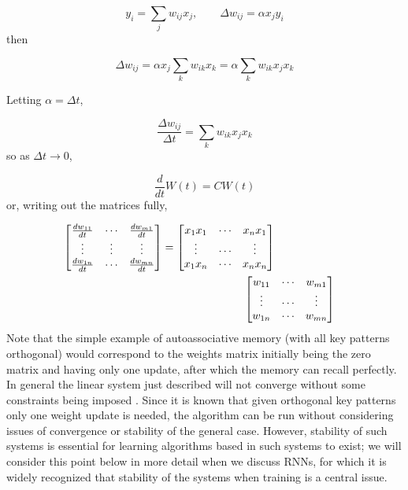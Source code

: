 \begin{equation*}
  y_i = \sum_{j} w_{ij} x_j, \qquad \Delta w_{ij} = \alpha x_j y_i
\end{equation*}
%
then

\begin{equation*}
\Delta w_{ij} = \alpha x_j \sum_k w_{ik} x_k = \alpha \sum_k w_{ik}x_j x_k
\end{equation*}

Letting $\alpha = \Delta t$,

\begin{equation*}
  \frac{\Delta w_{ij}}{\Delta t} = \sum_k w_{ik}x_j x_k
\end{equation*}
%
so as $\Delta t \rightarrow 0$,

\begin{equation*}
\frac{d}{dt}W(t) = C W(t)
\end{equation*}
%
or, writing out the matrices fully,

\begin{equation*}
  \begin{split}
  \begin{bmatrix}
    \frac{dw_{11}}{dt} & \cdots & \frac{dw_{m1}}{dt} \\
    \vdots & \vdots & \vdots \\
    \frac{dw_{1n}}{dt} & \cdots & \frac{dw_{mn}}{dt} \\
  \end{bmatrix} = \begin{bmatrix}
    x_1 x_1 & \cdots & x_n x_1 \\
    \vdots & \cdots & \vdots \\
    x_1 x_n & \cdots & x_n x_n
  \end{bmatrix} \\
  & \hspace{-1.0cm}\begin{bmatrix}
    w_{11} & \cdots & w_{m1} \\
    \vdots & \cdots & \vdots \\
    w_{1n} & \cdots & w_{mn}
    \end{bmatrix}
  \end{split}
\end{equation*}
%
Note that the simple example of autoassociative memory (with all key patterns orthogonal) would correspond to the weights matrix initially being the zero matrix and having only one update, after which the memory can recall perfectly. In general the linear system just described will not converge without some constraints being imposed \cite[p. 40]{fyfe2000}. Since it is known that given orthogonal key patterns only one weight update is needed, the algorithm can be run without considering issues of convergence or stability of the general case. However, stability of such systems is essential for learning algorithms based in such systems to exist; we will consider this point below in more detail when we discuss RNNs, for which it is widely recognized that stability of the systems when training is a central issue.

